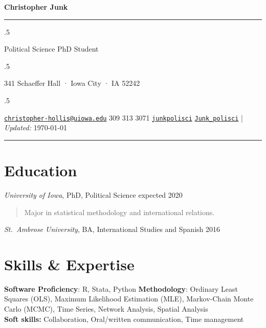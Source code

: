 \documentclass[10pt,]{article}
\begin{document}
\centerline{\huge \bf Christopher Junk}

\vspace{2 mm}

\hrule

\vspace{2 mm}

\moveleft.5\hoffset\centerline{Political Science PhD Student}
\moveleft.5\hoffset\centerline{341 Schaeffer Hall · Iowa City · IA 52242}
\moveleft.5\hoffset\centerline{ \faEnvelopeO \hspace{1 mm} \href{mailto:}{\tt \href{mailto:christopher-hollis@uiowa.edu}{\nolinkurl{christopher-hollis@uiowa.edu}}} \hspace{1 mm}  \faPhone \hspace{1 mm}  309 313 3071  \hspace{1 mm}  \faGithub \hspace{1 mm} \href{http://github.com/junkpolisci}{\tt junkpolisci} \hspace{1 mm}   \faTwitter \hspace{1 mm} \href{https:/twitter.com/Junk\_polisci}{\tt Junk\_polisci} \hspace{1 mm}    | \emph{Updated:} \today}

\vspace{2 mm}

\hrule


\section{Education}\label{education}

\emph{University of Iowa}, PhD, Political Science \hfill expected 2020

\begin{quote}
Major in statistical methodology and international relations.
\end{quote}

\emph{St.~Ambrose University}, BA, International Studies and Spanish
\hfill 2016

\section{Skills \& Expertise}\label{skills-expertise}

\textbf{Software Proficiency}: R, Stata, Python \textbf{Methodology}:
Ordinary Least Squares (OLS), Maximum Likelihood Estimation (MLE),
Markov-Chain Monte Carlo (MCMC), Time Series, Network Analysis, Spatial
Analysis\\
\textbf{Soft skills:} Collaboration, Oral/written communication, Time
management
\end{document}
